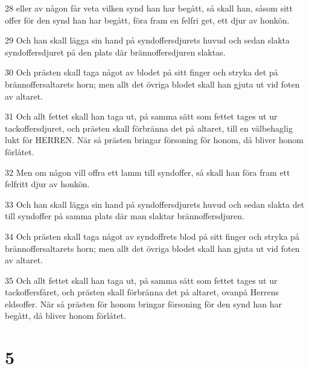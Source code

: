 \par 28 eller av någon får veta vilken synd han har begått, så skall han, såsom sitt offer för den synd han har begått, föra fram en felfri get, ett djur av honkön.
\par 29 Och han skall lägga sin hand på syndoffersdjurets huvud och sedan slakta syndoffersdjuret på den plats där brännoffersdjuren slaktas.
\par 30 Och prästen skall taga något av blodet på sitt finger och stryka det på brännoffersaltarets horn; men allt det övriga blodet skall han gjuta ut vid foten av altaret.
\par 31 Och allt fettet skall han taga ut, på samma sätt som fettet tages ut ur tackoffersdjuret, och prästen skall förbränna det på altaret, till en välbehaglig lukt för HERREN. När så prästen bringar försoning för honom, då bliver honom förlåtet.
\par 32 Men om någon vill offra ett lamm till syndoffer, så skall han föra fram ett felfritt djur av honkön.
\par 33 Och han skall lägga sin hand på syndoffersdjurets huvud och sedan slakta det till syndoffer på samma plats där man slaktar brännoffersdjuren.
\par 34 Och prästen skall taga något av syndoffrets blod på sitt finger och stryka på brännoffersaltarets horn; men allt det övriga blodet skall han gjuta ut vid foten av altaret.
\par 35 Och allt fettet skall han taga ut, på samma sätt som fettet tages ut ur tackoffersfåret, och prästen skall förbränna det på altaret, ovanpå Herrens eldsoffer. När så prästen för honom bringar försoning för den synd han har begått, då bliver honom förlåtet.

\chapter{5}

